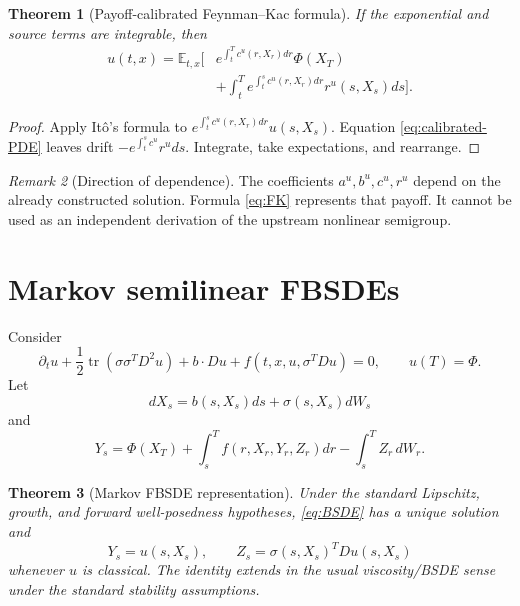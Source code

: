 \documentclass[11pt,reqno]{amsart}
\newtheorem{theorem}{Theorem}[section]
\theoremstyle{definition}
\theoremstyle{remark}
\newtheorem{remark}[theorem]{Remark}
\newcommand{\E}{\mathbb E}
\newcommand{\tr}{\operatorname{tr}}
\begin{document}
\begin{theorem}[Payoff-calibrated Feynman--Kac formula]\label{thm:FK}
If the exponential and source terms are integrable, then
\begin{equation}\label{eq:FK}
\begin{aligned}
 u(t,x)=\E_{t,x}\Big[&e^{\int_t^Tc^u(r,X_r)dr}\Phi(X_T)\\
 &+\int_t^Te^{\int_t^sc^u(r,X_r)dr}r^u(s,X_s)ds\Big].
\end{aligned}
\end{equation}
\end{theorem}

\begin{proof}
Apply It\^o's formula to
$e^{\int_t^sc^u(r,X_r)dr}u(s,X_s)$.  Equation
\eqref{eq:calibrated-PDE} leaves drift
$-e^{\int_t^sc^u}r^u ds$.  Integrate, take expectations, and rearrange.
\end{proof}

\begin{remark}[Direction of dependence]
The coefficients $a^u,b^u,c^u,r^u$ depend on the already constructed
solution.  Formula \eqref{eq:FK} represents that payoff.  It cannot be used as
an independent derivation of the upstream nonlinear semigroup.
\end{remark}

\section{Markov semilinear FBSDEs}\label{sec:markov-bsde}

Consider
\begin{equation}\label{eq:semilinear-PDE}
 \partial_tu+\frac12\tr(\sigma\sigma^TD^2u)+b\cdot Du
 +f(t,x,u,\sigma^TDu)=0,
 \qquad u(T)=\Phi.
\end{equation}
Let
\begin{equation}\label{eq:forward}
 dX_s=b(s,X_s)ds+\sigma(s,X_s)dW_s
\end{equation}
and
\begin{equation}\label{eq:BSDE}
 Y_s=\Phi(X_T)+\int_s^Tf(r,X_r,Y_r,Z_r)dr-
 \int_s^TZ_r\,dW_r.
\end{equation}

\begin{theorem}[Markov FBSDE representation]\label{thm:FBSDE}
Under the standard Lipschitz, growth, and forward well-posedness hypotheses,
\eqref{eq:BSDE} has a unique solution and
\begin{equation}\label{eq:YZ}
 Y_s=u(s,X_s),
 \qquad
 Z_s=\sigma(s,X_s)^TDu(s,X_s)
\end{equation}
whenever $u$ is classical.  The identity extends in the usual viscosity/BSDE
sense under the standard stability assumptions.
\end{theorem}
\end{document}
